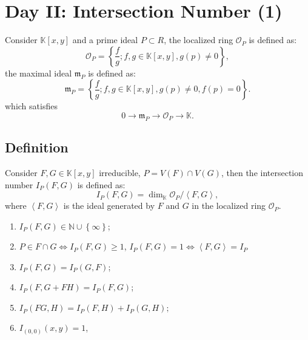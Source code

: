 \documentclass[10pt]{article}
\begin{document}
\section{Day II: Intersection Number (1)}

\begin{definition}
  Consider $ \mathbb{K}[x,y]$ and a prime ideal $ P \subset R$, the localized ring $ \mathcal{O}_P$ is defined as:
  \begin{equation*}
    \mathcal{O}_P = \left\{ \frac{f}{g} ; f, g \in \mathbb{K}[x,y] , g(p) \neq 0 \right\},
  \end{equation*}
  the maximal ideal $ \mathfrak{m}_P$ is defined as:
  \begin{equation*}
    \mathfrak{m}_P = \left\{ \frac{f}{g} ; f,g \in \mathbb{K}[x,y] , g(p) \neq 0 , f(p) = 0\right\}.
  \end{equation*}
  which satisfies
  \begin{equation*}
    0 \rightarrow \mathfrak{m}_P \rightarrow \mathcal{O}_P \rightarrow \mathbb{K}.
  \end{equation*}
\end{definition}

\subsection{Definition}

\begin{definition}
  Consider $ F, G \in \mathbb{K}[x,y]$ irreducible, $ P = V(F) \cap V(G)$, then the intersection number $ I_P(F,G)$ is defined as:
  \begin{equation*}
    I_{P}(F,G) = \dim_{\mathbb{K}} \mathcal{O}_P / \left< F,G \right>,
  \end{equation*}
  where $\left< F,G \right>$ is the ideal generated by $ F$ and $ G$ in the localized ring $ \mathcal{O}_P$.
\end{definition}

\begin{proposition}
  \begin{enumerate}[(1)]
    \item $ I_{P}(F,G) \in \mathbb{N} \cup \left\{ \infty  \right\}$;
    \item $ P \in F \cap G \Leftrightarrow I_{P}(F,G) \ge 1$, $ I_{P}(F,G) = 1 \Leftrightarrow \left< F,G \right> = I_{P}$
    \item $ I_{P}(F,G) = I_{P}(G,F)$;
    \item $ I_{P}(F, G+FH) = I_{P}(F,G)$;
    \item $ I_{P}(FG, H) = I_{P}(F,H) + I_{P}(G,H);$
    \item $ I_{(0,0)}(x,y) = 1$,
  \end{enumerate}
\end{proposition}
\end{document}

